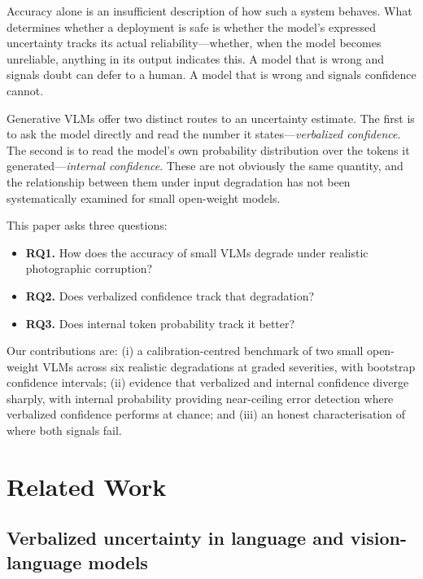 \documentclass[11pt]{article}
\begin{document}
Accuracy alone is an insufficient description of how such a system behaves. What
determines whether a deployment is safe is whether the model's expressed
uncertainty tracks its actual reliability---whether, when the model becomes
unreliable, anything in its output indicates this. A model that is wrong and
signals doubt can defer to a human. A model that is wrong and signals confidence
cannot.

Generative VLMs offer two distinct routes to an uncertainty estimate. The first
is to ask the model directly and read the number it states---\emph{verbalized
confidence}. The second is to read the model's own probability distribution over
the tokens it generated---\emph{internal confidence}. These are not obviously
the same quantity, and the relationship between them under input degradation has
not been systematically examined for small open-weight models.

This paper asks three questions:

\begin{itemize}
\item \textbf{RQ1.} How does the accuracy of small VLMs degrade under realistic
photographic corruption?
\item \textbf{RQ2.} Does verbalized confidence track that degradation?
\item \textbf{RQ3.} Does internal token probability track it better?
\end{itemize}

Our contributions are: (i) a calibration-centred benchmark of two small
open-weight VLMs across six realistic degradations at graded severities, with
bootstrap confidence intervals; (ii) evidence that verbalized and internal
confidence diverge sharply, with internal probability providing near-ceiling
error detection where verbalized confidence performs at chance; and (iii) an
honest characterisation of where both signals fail.


\section{Related Work}

\subsection{Verbalized uncertainty in language and vision-language models}
\end{document}
